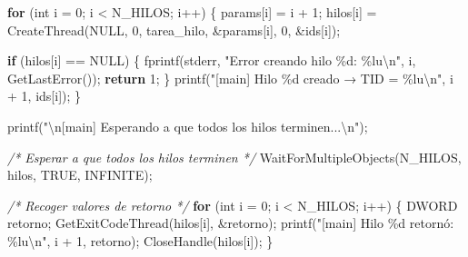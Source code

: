 \documentclass[
  spanish,
]{article}
\newenvironment{Shaded}{}{}
\newcommand{\CommentTok}[1]{\textcolor[rgb]{0.38,0.63,0.69}{\textit{#1}}}
\newcommand{\ControlFlowTok}[1]{\textcolor[rgb]{0.00,0.44,0.13}{\textbf{#1}}}
\newcommand{\DataTypeTok}[1]{\textcolor[rgb]{0.56,0.13,0.00}{#1}}
\newcommand{\DecValTok}[1]{\textcolor[rgb]{0.25,0.63,0.44}{#1}}
\newcommand{\NormalTok}[1]{#1}
\newcommand{\OperatorTok}[1]{\textcolor[rgb]{0.40,0.40,0.40}{#1}}
\newcommand{\SpecialCharTok}[1]{\textcolor[rgb]{0.25,0.44,0.63}{#1}}
\newcommand{\StringTok}[1]{\textcolor[rgb]{0.25,0.44,0.63}{#1}}
\begin{document}
\begin{Shaded}
\begin{Highlighting}[]
    \ControlFlowTok{for} \OperatorTok{(}\DataTypeTok{int}\NormalTok{ i }\OperatorTok{=} \DecValTok{0}\OperatorTok{;}\NormalTok{ i }\OperatorTok{\textless{}}\NormalTok{ N\_HILOS}\OperatorTok{;}\NormalTok{ i}\OperatorTok{++)} \OperatorTok{\{}
\NormalTok{        params}\OperatorTok{[}\NormalTok{i}\OperatorTok{]} \OperatorTok{=}\NormalTok{ i }\OperatorTok{+} \DecValTok{1}\OperatorTok{;}
\NormalTok{        hilos}\OperatorTok{[}\NormalTok{i}\OperatorTok{]} \OperatorTok{=}\NormalTok{ CreateThread}\OperatorTok{(}\NormalTok{NULL}\OperatorTok{,} \DecValTok{0}\OperatorTok{,}\NormalTok{ tarea\_hilo}\OperatorTok{,} \OperatorTok{\&}\NormalTok{params}\OperatorTok{[}\NormalTok{i}\OperatorTok{],} \DecValTok{0}\OperatorTok{,} \OperatorTok{\&}\NormalTok{ids}\OperatorTok{[}\NormalTok{i}\OperatorTok{]);}

        \ControlFlowTok{if} \OperatorTok{(}\NormalTok{hilos}\OperatorTok{[}\NormalTok{i}\OperatorTok{]} \OperatorTok{==}\NormalTok{ NULL}\OperatorTok{)} \OperatorTok{\{}
\NormalTok{            fprintf}\OperatorTok{(}\NormalTok{stderr}\OperatorTok{,} \StringTok{"Error creando hilo }\SpecialCharTok{\%d}\StringTok{: }\SpecialCharTok{\%lu\textbackslash{}n}\StringTok{"}\OperatorTok{,}\NormalTok{ i}\OperatorTok{,}\NormalTok{ GetLastError}\OperatorTok{());}
            \ControlFlowTok{return} \DecValTok{1}\OperatorTok{;}
        \OperatorTok{\}}
\NormalTok{        printf}\OperatorTok{(}\StringTok{"[main] Hilo }\SpecialCharTok{\%d}\StringTok{ creado → TID = }\SpecialCharTok{\%lu\textbackslash{}n}\StringTok{"}\OperatorTok{,}\NormalTok{ i }\OperatorTok{+} \DecValTok{1}\OperatorTok{,}\NormalTok{ ids}\OperatorTok{[}\NormalTok{i}\OperatorTok{]);}
    \OperatorTok{\}}

\NormalTok{    printf}\OperatorTok{(}\StringTok{"}\SpecialCharTok{\textbackslash{}n}\StringTok{[main] Esperando a que todos los hilos terminen...}\SpecialCharTok{\textbackslash{}n}\StringTok{"}\OperatorTok{);}

    \CommentTok{/* Esperar a que todos los hilos terminen */}
\NormalTok{    WaitForMultipleObjects}\OperatorTok{(}\NormalTok{N\_HILOS}\OperatorTok{,}\NormalTok{ hilos}\OperatorTok{,}\NormalTok{ TRUE}\OperatorTok{,}\NormalTok{ INFINITE}\OperatorTok{);}

    \CommentTok{/* Recoger valores de retorno */}
    \ControlFlowTok{for} \OperatorTok{(}\DataTypeTok{int}\NormalTok{ i }\OperatorTok{=} \DecValTok{0}\OperatorTok{;}\NormalTok{ i }\OperatorTok{\textless{}}\NormalTok{ N\_HILOS}\OperatorTok{;}\NormalTok{ i}\OperatorTok{++)} \OperatorTok{\{}
\NormalTok{        DWORD retorno}\OperatorTok{;}
\NormalTok{        GetExitCodeThread}\OperatorTok{(}\NormalTok{hilos}\OperatorTok{[}\NormalTok{i}\OperatorTok{],} \OperatorTok{\&}\NormalTok{retorno}\OperatorTok{);}
\NormalTok{        printf}\OperatorTok{(}\StringTok{"[main] Hilo }\SpecialCharTok{\%d}\StringTok{ retornó: }\SpecialCharTok{\%lu\textbackslash{}n}\StringTok{"}\OperatorTok{,}\NormalTok{ i }\OperatorTok{+} \DecValTok{1}\OperatorTok{,}\NormalTok{ retorno}\OperatorTok{);}
\NormalTok{        CloseHandle}\OperatorTok{(}\NormalTok{hilos}\OperatorTok{[}\NormalTok{i}\OperatorTok{]);}
    \OperatorTok{\}}


\end{Highlighting}
\end{Shaded}
\end{document}
